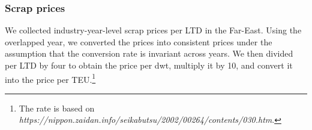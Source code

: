 \subsubsection{Scrap prices}

We collected industry-year-level scrap prices per LTD in the Far-East. Using the overlapped year, we converted the prices into consistent prices under the assumption that the conversion rate is invariant across years. We then divided per LTD by four to obtain the price per dwt, multiply it by 10, and convert it into the price per TEU.\footnote{The rate is based on \textit{https://nippon.zaidan.info/seikabutsu/2002/00264/contents/030.htm}.}

